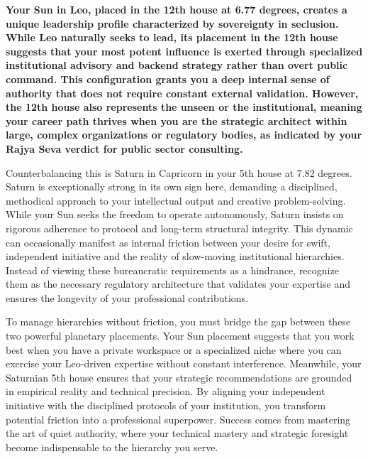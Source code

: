
\label{topic45}

{\fontsize{9.5}{13.8}\selectfont\bfseries\color{DeepSlate} Your Sun in Leo, placed in the 12th house at 6.77 degrees, creates a unique leadership profile characterized by sovereignty in seclusion. While Leo naturally seeks to lead, its placement in the 12th house suggests that your most potent influence is exerted through specialized institutional advisory and backend strategy rather than overt public command. This configuration grants you a deep internal sense of authority that does not require constant external validation. However, the 12th house also represents the unseen or the institutional, meaning your career path thrives when you are the strategic architect within large, complex organizations or regulatory bodies, as indicated by your Rajya Seva verdict for public sector consulting.}\par\vspace{2mm}

{\fontsize{9}{13}\selectfont Counterbalancing this is Saturn in Capricorn in your 5th house at 7.82 degrees. Saturn is exceptionally strong in its own sign here, demanding a disciplined, methodical approach to your intellectual output and creative problem-solving. While your Sun seeks the freedom to operate autonomously, Saturn insists on rigorous adherence to protocol and long-term structural integrity. This dynamic can occasionally manifest as internal friction between your desire for swift, independent initiative and the reality of slow-moving institutional hierarchies. Instead of viewing these bureaucratic requirements as a hindrance, recognize them as the necessary regulatory architecture that validates your expertise and ensures the longevity of your professional contributions.}\par\vspace{1.8mm}

{\fontsize{9}{13}\selectfont To manage hierarchies without friction, you must bridge the gap between these two powerful planetary placements. Your Sun placement suggests that you work best when you have a private workspace or a specialized niche where you can exercise your Leo-driven expertise without constant interference. Meanwhile, your Saturnian 5th house ensures that your strategic recommendations are grounded in empirical reality and technical precision. By aligning your independent initiative with the disciplined protocols of your institution, you transform potential friction into a professional superpower. Success comes from mastering the art of quiet authority, where your technical mastery and strategic foresight become indispensable to the hierarchy you serve.}\par\vspace{1.8mm}

